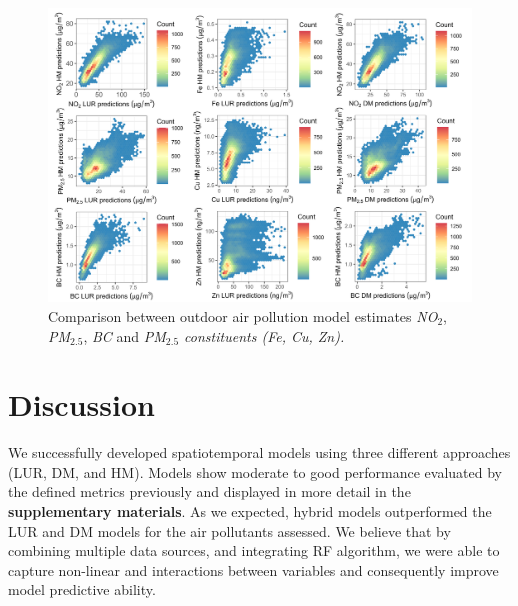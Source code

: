 \documentclass{article}
\begin{document}
\newpage


\captionsetup[figure]{skip=6pt}
\begin{figure}[!htb]
\includegraphics[width=1.0\textwidth]{figures/final_HEXBIN.png}
\caption{Comparison between outdoor air pollution model estimates \textit{NO$_2$}, \textit{PM$_{2.5}$}, \textit{BC} and \textit{PM$_{2.5}$ constituents (Fe, Cu, Zn).}}
\end{figure}

\newpage

\section{Discussion}
We successfully developed spatiotemporal models using three different approaches (LUR, DM, and HM). Models show moderate to good performance 
evaluated by the defined metrics previously and displayed in more detail in the \textbf{supplementary materials}. As we expected, hybrid models outperformed the LUR and DM models for the air pollutants assessed. We believe that by combining multiple data sources, and integrating RF algorithm, we were able to capture non-linear and interactions between variables and consequently improve model predictive ability. 
\end{document}
